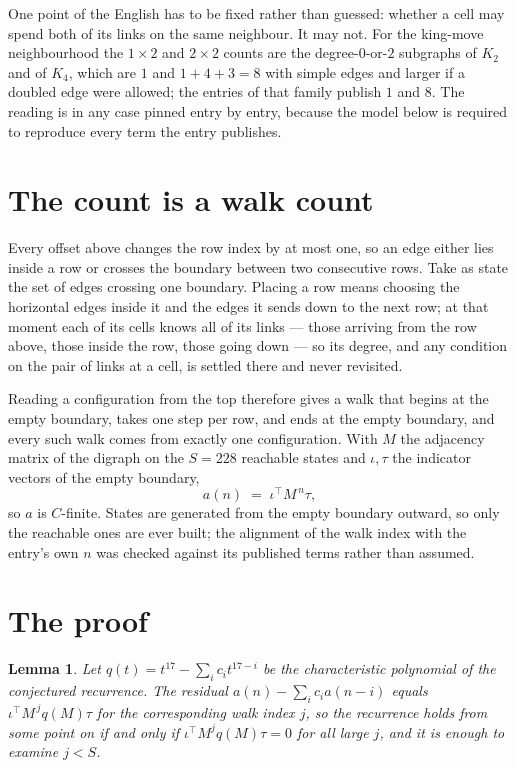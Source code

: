 \documentclass[11pt,a4paper]{article}
\theoremstyle{plain}
\newtheorem{lemma}[theorem]{Lemma}
\theoremstyle{definition}
\begin{document}
One point of the English has to be fixed rather than guessed: whether a cell may spend both of
its links on the same neighbour. It may not. For the king-move neighbourhood the $1\times2$
and $2\times2$ counts are the degree-$0$-or-$2$ subgraphs of $K_2$ and of $K_4$, which are $1$
and $1+4+3=8$ with simple edges and larger if a doubled edge were allowed; the entries of that
family publish $1$ and $8$. The reading is in any case pinned entry by entry, because the
model below is required to reproduce every term the entry publishes.


\section{The count is a walk count}

Every offset above changes the row index by at most one, so an edge either lies inside a row
or crosses the boundary between two consecutive rows. Take as state the set of edges crossing
one boundary. Placing a row means choosing the horizontal edges inside it and the edges it
sends down to the next row; at that moment each of its cells knows all of its links --- those
arriving from the row above, those inside the row, those going down --- so its degree, and any
condition on the pair of links at a cell, is settled there and never revisited.

Reading a configuration from the top therefore gives a walk that begins at the empty boundary,
takes one step per row, and ends at the empty boundary, and every such walk comes from exactly
one configuration. With $M$ the adjacency matrix of the digraph on the $S=228$ reachable
states and $\iota,\tau$ the indicator vectors of the empty boundary,
\[
a(n)\;=\;\iota^{\!\top}M^{\,n}\tau ,
\]
so $a$ is $C$-finite. States are generated from the empty boundary outward, so only the
reachable ones are ever built; the alignment of the walk index with the entry's own $n$ was
checked against its published terms rather than assumed.

\section{The proof}

\begin{lemma}\label{lem:crit}
Let $q(t)=t^{17}-\sum_i c_it^{17-i}$ be the characteristic polynomial of the
conjectured recurrence. The residual $a(n)-\sum_ic_ia(n-i)$ equals
$\iota^{\!\top}M^{\,j}q(M)\tau$ for the corresponding walk index $j$, so the recurrence
holds from some point on if and only if $\iota^{\!\top}M^{j}q(M)\tau=0$ for all large $j$,
and it is enough to examine $j<S$.
\end{lemma}
\end{document}
